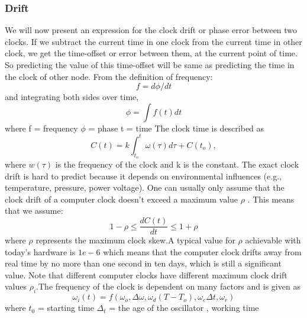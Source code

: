 \documentclass[a4paper,8pt]{report}
\begin{document}
\subsubsection{Drift} We will now present an expression for the clock
drift or phase error between two clocks. If we subtract the current
time in one clock from the current time in other clock, we get the
time-offset or error between them, at the current point of time. So
predicting the value of this time-offset will be same as predicting
the time in the clock of other node.
      From the definition of frequency:
\begin{equation}
f = d\phi/dt \label{freq_defn}
\end{equation}
and integrating both sides over time,
 \begin{equation}
\phi =\int f(t)dt
 \end{equation}
where
      f = frequency
      $\phi$ = phase
      t = time\newline
     \newline The clock time is described as
\begin{equation}
C(t) = k\int_{t_o}^{t} {\omega(\tau)d\tau} + C(t_o) ,
\end{equation}
where $w(\tau)$ is the frequency of the clock and k is the constant.
The exact clock drift is hard to predict because it depends on
environmental influences (e.g., temperature, pressure, power
voltage). One can usually only assume that the clock drift of a
computer clock doesn't exceed a maximum value $\rho$ . This means
that we assume:
\begin{equation}
1-\rho \leq \frac{dC(t)}{dt} \leq 1+\rho
\end{equation}
where $\rho$ represents the maximum clock skew.A typical value for
$\rho$ achievable with today's hardware is $1e-6$ which means that
the computer clock drifts away from real time by no more than one
second in ten days, which is still a significant value. Note that
different computer clocks have different maximum clock drift values
$\rho_i$.\newline The frequency of the clock is dependent on many
factors and is given as
\begin{equation}
\omega_i(t) =f(\omega_o, \Delta
\omega,\omega_d(T-T_o),\omega_e\Delta t,\omega_r) \label{frequency}
\end{equation}
where\newline
      $t_0$ = starting time \newline
      $\Delta_t$ = the age of the oscillator , working time  \newline
\end{document}
